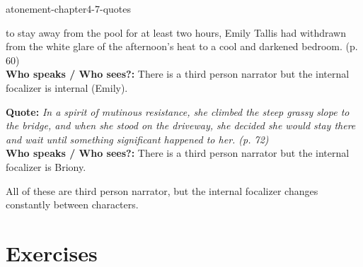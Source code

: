 \documentclass[preview]{standalone}
\begin{document}
\begin{snippet}{atonement-chapter4-7-quotes}
\begin{minipage}[r]{0.95\textwidth}
{        to stay away from the pool for at least two
        hours, Emily Tallis had withdrawn from the
        white glare of the afternoon's heat to a cool
        and darkened bedroom. (p. 60)
    }
    \\
    \textbf{Who speaks / Who sees?:}
    There is a third person narrator but the internal focalizer is
    internal (Emily).
\end{minipage}
\hr
\begin{minipage}[l]{0.05\textwidth}
\end{minipage}
\begin{minipage}[r]{0.95\textwidth}
    \textbf{Quote:} \textit{
        In a spirit of mutinous resistance, she
        climbed the steep grassy slope to the bridge,
        and when she stood on the driveway, she
        decided she would stay there and wait until
        something significant happened to her. (p.
        72)
    }
    \\
    \textbf{Who speaks / Who sees?:}
    There is a third person narrator but the internal focalizer is Briony.
\end{minipage}
\end{snippet}

\begin{plainhtml}
    All of these are third person narrator, but the internal focalizer
    changes constantly between characters.
\end{plainhtml}

\section{Exercises}
\end{document}
